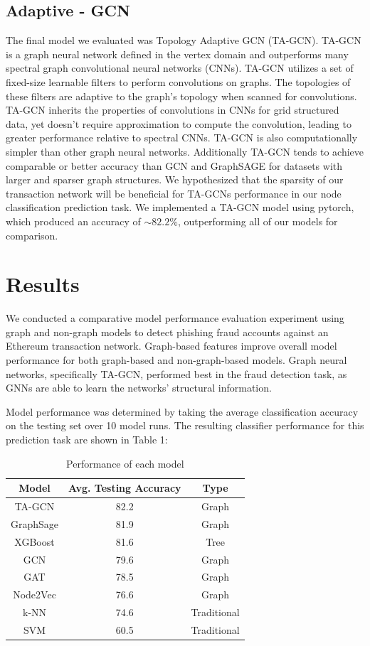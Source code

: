 \documentclass{article}
\begin{document}
\subsection{Adaptive - GCN}
	The final model we evaluated was Topology Adaptive GCN (TA-GCN). TA-GCN is a graph neural network defined in the vertex domain and outperforms many spectral graph convolutional neural networks (CNNs). TA-GCN utilizes a set of fixed-size learnable filters to perform convolutions on graphs. The topologies of these filters are adaptive to the graph’s topology when scanned for convolutions. TA-GCN inherits the properties of convolutions in CNNs for grid structured data, yet doesn’t require approximation to compute the convolution, leading to greater performance relative to spectral CNNs. TA-GCN is also computationally simpler than other graph neural networks. Additionally TA-GCN tends to achieve comparable or better accuracy than GCN and GraphSAGE for datasets with larger and sparser graph structures. We hypothesized that the sparsity of our transaction network will be beneficial for TA-GCNs performance in our node classification prediction task. We implemented a TA-GCN model using pytorch, which produced an accuracy of $\sim$$82.2\%$, outperforming all of our models for comparison.
 
\section{Results}
    We conducted a comparative model performance evaluation experiment using graph and non-graph models to detect phishing fraud accounts against an Ethereum transaction network. Graph-based features improve overall model performance for both graph-based and non-graph-based models. Graph neural networks, specifically TA-GCN, performed best in the fraud detection task, as GNNs are able to learn the networks’ structural information. 

    Model performance was determined by taking the average classification accuracy on the testing set over 10 model runs. The resulting classifier performance for this prediction task are shown in Table 1:
    
\begin{table}[h]
\centering
\begin{tabular}{ |c|c|c| } 
	\hline
	Model & Avg. Testing Accuracy & Type \\
	\hline \hline
	TA-GCN & 82.2 & Graph \\ 
	\hline
    GraphSage & 81.9 & Graph \\ 
	\hline
	XGBoost & 81.6 & Tree \\ 
	\hline
	GCN & 79.6 & Graph \\ 
	\hline
	GAT & 78.5 & Graph \\ 
	\hline
	Node2Vec & 76.6 & Graph \\ 
	\hline
	k-NN & 74.6 & Traditional \\ 
	\hline
	SVM & 60.5 & Traditional \\ 
	\hline
\end{tabular}
\caption{Performance of each model}
\end{table}
\end{document}
